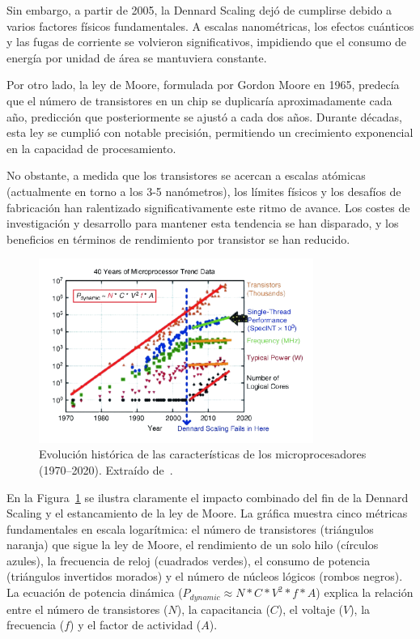 \documentclass[11pt,spanish,listoffigures,listoftables]{tfgetsinf}
\begin{document}
Sin embargo, a partir de 2005, la Dennard Scaling dejó de cumplirse debido a varios factores físicos fundamentales. A escalas nanométricas, los efectos cuánticos y las fugas de corriente se volvieron significativos, impidiendo que el consumo de energía por unidad de área se mantuviera constante.

Por otro lado, la ley de Moore\cite{moore1965cramming}, formulada por Gordon Moore en 1965, predecía que el número de transistores en un chip se duplicaría aproximadamente cada año, predicción que posteriormente se ajustó a cada dos años. Durante décadas, esta ley se cumplió con notable precisión, permitiendo un crecimiento exponencial en la capacidad de procesamiento.

No obstante, a medida que los transistores se acercan a escalas atómicas (actualmente en torno a los 3-5 nanómetros), los límites físicos y los desafíos de fabricación han ralentizado significativamente este ritmo de avance. Los costes de investigación y desarrollo para mantener esta tendencia se han disparado, y los beneficios en términos de rendimiento por transistor se han reducido.

\begin{figure}[H]
   \centering
   \includegraphics[width=0.8\textwidth]{images/estado_del_arte/dennard_scaling.png}
   \caption[Evolución histórica de las características de los microprocesadores (1970--2020)]{Evolución histórica de las características de los microprocesadores (1970--2020). Extraído de~\cite[p.~8]{ConteRebootingComputing}.}
   \label{fig:dennard_scaling}
\end{figure}

En la Figura~\ref{fig:dennard_scaling} se ilustra claramente el impacto combinado del fin de la Dennard Scaling y el estancamiento de la ley de Moore. La gráfica muestra cinco métricas fundamentales en escala logarítmica: el número de transistores (triángulos naranja) que sigue la ley de Moore, el rendimiento de un solo hilo (círculos azules), la frecuencia de reloj (cuadrados verdes), el consumo de potencia (triángulos invertidos morados) y el número de núcleos lógicos (rombos negros). La ecuación de potencia dinámica ($P_{dynamic} \approx N * C * V^2 * f * A$) explica la relación entre el número de transistores ($N$), la capacitancia ($C$), el voltaje ($V$), la frecuencia ($f$) y el factor de actividad ($A$).
\end{document}
